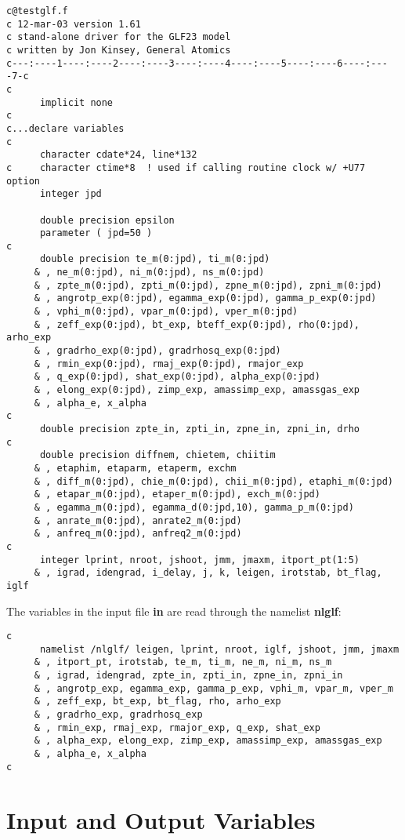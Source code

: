 \small
\begin{verbatim}
c@testglf.f
c 12-mar-03 version 1.61
c stand-alone driver for the GLF23 model
c written by Jon Kinsey, General Atomics
c---:----1----:----2----:----3----:----4----:----5----:----6----:----7-c
c
      implicit none
c
c...declare variables
c
      character cdate*24, line*132
c     character ctime*8  ! used if calling routine clock w/ +U77 option
      integer jpd

      double precision epsilon
      parameter ( jpd=50 )
c 
      double precision te_m(0:jpd), ti_m(0:jpd)
     & , ne_m(0:jpd), ni_m(0:jpd), ns_m(0:jpd)
     & , zpte_m(0:jpd), zpti_m(0:jpd), zpne_m(0:jpd), zpni_m(0:jpd)
     & , angrotp_exp(0:jpd), egamma_exp(0:jpd), gamma_p_exp(0:jpd)
     & , vphi_m(0:jpd), vpar_m(0:jpd), vper_m(0:jpd)
     & , zeff_exp(0:jpd), bt_exp, bteff_exp(0:jpd), rho(0:jpd), arho_exp
     & , gradrho_exp(0:jpd), gradrhosq_exp(0:jpd)
     & , rmin_exp(0:jpd), rmaj_exp(0:jpd), rmajor_exp
     & , q_exp(0:jpd), shat_exp(0:jpd), alpha_exp(0:jpd)
     & , elong_exp(0:jpd), zimp_exp, amassimp_exp, amassgas_exp
     & , alpha_e, x_alpha
c
      double precision zpte_in, zpti_in, zpne_in, zpni_in, drho
c
      double precision diffnem, chietem, chiitim
     & , etaphim, etaparm, etaperm, exchm
     & , diff_m(0:jpd), chie_m(0:jpd), chii_m(0:jpd), etaphi_m(0:jpd)
     & , etapar_m(0:jpd), etaper_m(0:jpd), exch_m(0:jpd)
     & , egamma_m(0:jpd), egamma_d(0:jpd,10), gamma_p_m(0:jpd)
     & , anrate_m(0:jpd), anrate2_m(0:jpd)
     & , anfreq_m(0:jpd), anfreq2_m(0:jpd)
c
      integer lprint, nroot, jshoot, jmm, jmaxm, itport_pt(1:5)
     & , igrad, idengrad, i_delay, j, k, leigen, irotstab, bt_flag, iglf
\end{verbatim}
\rm
The variables in the input file {\bf in} are read through 
the namelist {\bf nlglf}:
\small
\begin{verbatim}
c
      namelist /nlglf/ leigen, lprint, nroot, iglf, jshoot, jmm, jmaxm
     & , itport_pt, irotstab, te_m, ti_m, ne_m, ni_m, ns_m
     & , igrad, idengrad, zpte_in, zpti_in, zpne_in, zpni_in
     & , angrotp_exp, egamma_exp, gamma_p_exp, vphi_m, vpar_m, vper_m
     & , zeff_exp, bt_exp, bt_flag, rho, arho_exp
     & , gradrho_exp, gradrhosq_exp
     & , rmin_exp, rmaj_exp, rmajor_exp, q_exp, shat_exp
     & , alpha_exp, elong_exp, zimp_exp, amassimp_exp, amassgas_exp
     & , alpha_e, x_alpha
c
\end{verbatim}

\rm
\section{Input and Output Variables}

